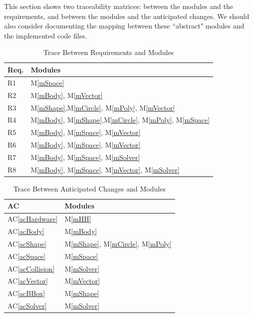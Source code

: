\documentclass[12pt]{article}
\begin{document}
This section shows two traceability matrices: between the modules and the
requirements, and between the modules and the anticipated changes. We should also consider documenting the mapping between these ``abstract" modules and the implemented code files.

\begin{table}[h!]
\centering
\begin{tabular}{p{} p{}}
\toprule
\textbf{Req.} & \textbf{Modules}\\
\midrule
	R1 & M\ref{mSpace} \\
	R2 & M\ref{mBody}, M\ref{mVector} \\
	R3 & M\ref{mShape},M\ref{mCircle}, M\ref{mPoly}, M\ref{mVector} \\
	R4 & M\ref{mBody}, M\ref{mShape},M\ref{mCircle}, M\ref{mPoly}, M\ref{mSpace} \\
	R5 & M\ref{mBody}, M\ref{mSpace}, M\ref{mVector} \\
	R6 & M\ref{mBody}, M\ref{mSpace}, M\ref{mVector} \\
	R7 & M\ref{mBody}, M\ref{mSpace}, M\ref{mSolver}\\
	R8 & M\ref{mBody}, M\ref{mSpace}, M\ref{mVector},
	M\ref{mSolver} \\
\bottomrule
\end{tabular}
\caption{Trace Between Requirements and Modules}
\label{TblRT}
\end{table}

\begin{table}[h!]
\centering
\begin{tabular}{p{} p{}}
\toprule
	\textbf{AC} & \textbf{Modules}\\
\midrule
	AC\ref{acHardware} & M\ref{mHH} \\
	AC\ref{acBody} & M\ref{mBody} \\
	AC\ref{acShape} & M\ref{mShape}, M\ref{mCircle}, M\ref{mPoly} \\
	AC\ref{acSpace} & M\ref{mSpace} \\
	AC\ref{acCollision} & M\ref{mSolver} \\
	AC\ref{acVector} & M\ref{mVector} \\
	AC\ref{acBBox} & M\ref{mShape} \\
	AC\ref{acSolver} & M\ref{mSolver} \\

\bottomrule
\end{tabular}
\caption{Trace Between Anticipated Changes and Modules}
\label{TblAT}
\end{table}
\end{document}
